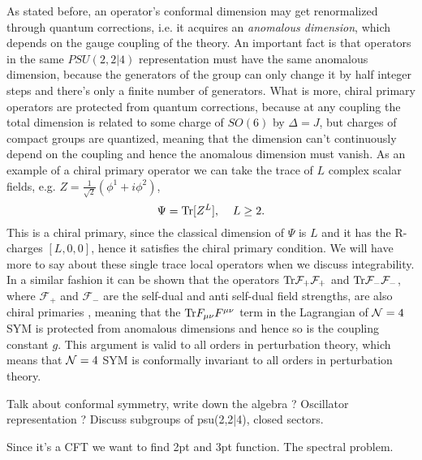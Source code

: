 As stated before, an operator's conformal dimension may get renormalized through quantum corrections, i.e. it acquires an \emph{anomalous dimension}, which depends on the gauge coupling of the theory. An important fact is that operators in the same $PSU(2,2|4)$ representation must have the same anomalous dimension, because the generators of the group can only change it by half integer steps and there's only a finite number of generators. What is more, chiral primary operators are protected from quantum corrections, because at any coupling the total dimension is related to some charge of $SO(6)$ by $\Delta = J$, but charges of compact groups are quantized, meaning that the dimension can't continuously depend on the coupling and hence the anomalous dimension must vanish. As an example of a chiral primary operator we can take the trace of $L$ complex scalar fields, e.g. $Z = \frac{1}{\sqrt{2}}(\phi^1 + i \phi^2)$,
\begin{equation}
	\Psi = \mathrm{Tr} [Z^L], \; \; \; \; L \geq 2.
\end{equation}
This is a chiral primary, since the classical dimension of $\Psi$ is $L$ and it has the R-charges $[L, 0, 0]$, hence it satisfies the chiral primary condition. We will have more to say about these single trace local operators when we discuss integrability. In a similar fashion it can be shown that the operators $\mathrm{Tr} \mathcal{F}_+ \mathcal{F}_+$ and $\mathrm{Tr} \mathcal{F}_- \mathcal{F}_- $, where $\mathcal{F}_+$ and $\mathcal{F}_-$ are the self-dual and anti self-dual field strengths, are also chiral primaries \cite{minahan_spinchains}, meaning that the $\mathrm{Tr} F_{\mu\nu} F^{\mu\nu}$ term in the Lagrangian of $\mathcal{N}=4$ SYM is protected from anomalous dimensions and hence so is the coupling constant $g$. This argument is valid to all orders in perturbation theory, which means that $\mathcal{N}=4$ SYM is conformally invariant to all orders in perturbation theory.

Talk about conformal symmetry, write down the algebra ? Oscillator representation ? Discuss subgroups of psu(2,2|4), closed sectors. 

Since it's a CFT we want to find 2pt and 3pt function. The spectral problem.



